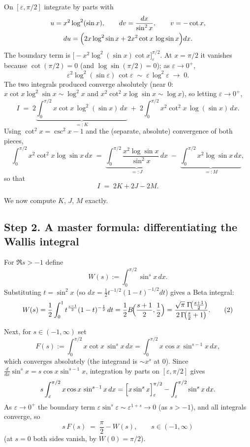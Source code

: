 \documentclass[11pt]{article}
\theoremstyle{remark}
\begin{document}
On $[\varepsilon,\pi/2]$ integrate by parts with
$$\begin{gathered}
u=x^{2}\log^{2}(\sin x),\qquad dv=\frac{dx}{\sin^{2}x},\qquad v=-\cot x,\\
du=\Bigl(2x\log^{2}\sin x+2x^{2}\cot x\,\log\sin x\Bigr)dx .
\end{gathered}$$
The boundary term is $\bigl[-x^{2}\log^{2}(\sin x)\cot x\bigr]_{\varepsilon}^{\pi/2}$. At $x=\pi/2$ it vanishes because $\cot(\pi/2)=0$ (and $\log\sin(\pi/2)=0$); as $\varepsilon\to0^{+}$,
$$\varepsilon^{2}\log^{2}(\sin\varepsilon)\,\cot\varepsilon\;\sim\;\varepsilon\,\log^{2}\varepsilon\;\longrightarrow\;0 .$$
The two integrals produced converge absolutely (near $0$: $x\cot x\log^{2}\sin x\sim\log^{2}x$ and $x^{2}\cot^{2}x\log\sin x\sim\log x$), so letting $\varepsilon\to0^{+}$,
$$I \;=\; 2\underbrace{\int_0^{\pi/2}x\cot x\,\log^{2}(\sin x)\,dx}_{=:K}\;+\;2\int_0^{\pi/2}x^{2}\cot^{2}x\,\log(\sin x)\,dx .$$
Using $\cot^{2}x=\csc^{2}x-1$ and the (separate, absolute) convergence of both pieces,
$$\int_0^{\pi/2}x^{2}\cot^{2}x\log\sin x\,dx \;=\; \underbrace{\int_0^{\pi/2}\frac{x^{2}\log\sin x}{\sin^{2}x}\,dx}_{=:J}\;-\;\underbrace{\int_0^{\pi/2}x^{2}\log\sin x\,dx}_{=:M},$$
so that
\begin{equation}I \;=\; 2K+2J-2M. \tag{1}\end{equation}

We now compute $K$, $J$, $M$ exactly.

\subsection*{Step 2. A master formula: differentiating the Wallis integral}

For $\Re s>-1$ define
$$W(s):=\int_0^{\pi/2}\sin^{s}x\,dx .$$
Substituting $t=\sin^{2}x$ (so $dx=\tfrac12 t^{-1/2}(1-t)^{-1/2}dt$) gives a Beta integral:
\begin{equation}W(s)=\frac12\int_0^{1}t^{\frac{s-1}{2}}(1-t)^{-\frac12}\,dt=\frac12 B\!\Bigl(\frac{s+1}{2},\frac12\Bigr)
=\frac{\sqrt{\pi}\;\Gamma\!\bigl(\frac{s+1}{2}\bigr)}{2\,\Gamma\!\bigl(\frac{s}{2}+1\bigr)} . \tag{2}\end{equation}

Next, for $s\in(-1,\infty)$ set
$$F(s):=\int_0^{\pi/2}x\cot x\,\sin^{s}x\,dx
=\int_0^{\pi/2}x\cos x\,\sin^{s-1}x\,dx ,$$
which converges absolutely (the integrand is $\sim x^{s}$ at $0$). Since $\frac{d}{dx}\sin^{s}x=s\cos x\sin^{s-1}x$, integration by parts on $[\varepsilon,\pi/2]$ gives
$$s\int_\varepsilon^{\pi/2}x\cos x\,\sin^{s-1}x\,dx=\Bigl[x\sin^{s}x\Bigr]_\varepsilon^{\pi/2}-\int_\varepsilon^{\pi/2}\sin^{s}x\,dx .$$
As $\varepsilon\to0^{+}$ the boundary term $\varepsilon\sin^{s}\varepsilon\sim\varepsilon^{1+s}\to0$ (as $s>-1$), and all integrals converge, so
\begin{equation}s\,F(s)\;=\;\frac{\pi}{2}-W(s),\qquad s\in(-1,\infty) \tag{3}\end{equation}
(at $s=0$ both sides vanish, by $W(0)=\pi/2$).
\end{document}
